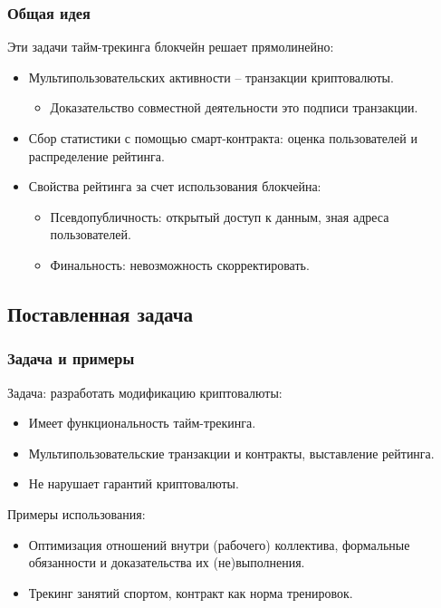 \documentclass[11pt,handout,pdf,hyperref={unicode}]{beamer}
\begin{document}
\begin{frame}
  \frametitle{Общая идея}

  Эти задачи тайм-трекинга блокчейн решает прямолинейно:
  \begin{itemize}
  \item Мультипользовательских активности -- транзакции криптовалюты.
    \begin{itemize}
    \item Доказательство совместной деятельности это подписи транзакции.
    \end{itemize}
  \item Сбор статистики с помощью смарт-контракта: оценка
    пользователей и распределение рейтинга.
  \item Свойства рейтинга за счет использования блокчейна:
    \begin{itemize}
    \item Псевдопубличность: открытый доступ к данным, зная адреса
      пользователей.
    \item Финальность: невозможность скорректировать.
    \end{itemize}
  \end{itemize}
\end{frame}

\subsection{Поставленная задача}

\begin{frame}
  \frametitle{Задача и примеры} Задача: разработать модификацию
  криптовалюты:
  \begin{itemize}
  \item Имеет функциональность тайм-трекинга.
  \item Мультипользовательские транзакции и контракты, выставление рейтинга.
  \item Не нарушает гарантий криптовалюты.
  \end{itemize}

  Примеры использования:
  \begin{itemize}
    \item Оптимизация отношений внутри (рабочего) коллектива,
      формальные обязанности и доказательства их (не)выполнения.
    \item Трекинг занятий спортом, контракт как норма тренировок.
  \end{itemize}
\end{frame}
\end{document}
